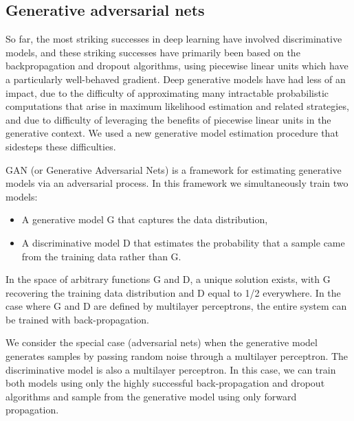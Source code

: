 \documentclass{article} %
\begin{document}
\subsection{Generative adversarial nets}
So far, the most striking successes in deep learning have involved discriminative models, and these striking successes have primarily been based on the backpropagation and dropout algorithms, using piecewise linear units which have a particularly well-behaved gradient. Deep generative models have had less of an impact, due to the difficulty of approximating many intractable probabilistic computations that arise in maximum likelihood estimation and related strategies, and due to difficulty of leveraging
the benefits of piecewise linear units in the generative context. We used a new generative model
estimation procedure that sidesteps these difficulties.

GAN (or Generative Adversarial Nets) is a framework for estimating generative models via an adversarial process. In this framework we simultaneously train two models:  
\begin{itemize}
    \setlength\itemsep{-1em}
    \item A generative model G that captures the data distribution,
    \item A discriminative model D that estimates the probability that a sample came from the training data rather than G.
\end{itemize}
In the space of arbitrary functions G and D, a unique solution exists, with G recovering the training data distribution and D equal to 1/2 everywhere. In the case where G and D are defined by multilayer perceptrons, the entire system can be trained with back-propagation.

We consider the special case (adversarial nets) when the generative model generates samples by passing random noise through a multilayer perceptron. The discriminative model is also a multilayer perceptron. In this case, we can train both models using only the highly successful back-propagation and dropout algorithms and sample from the generative model using only forward propagation.
\end{document}

